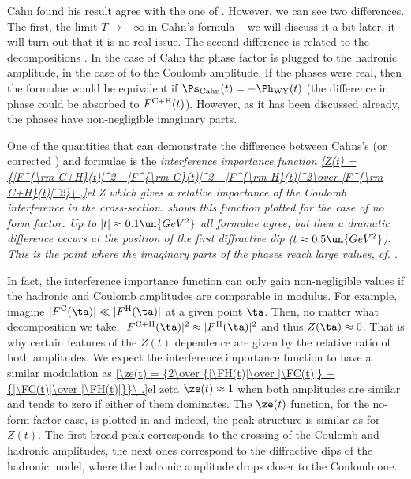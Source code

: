 Cahn found his result  agree with the one of \WY{} . However, we can see two differences. The first, the limit $T\to -\infty$ in Cahn's formula -- we will discuss it a bit later, it will turn out that it is no real issue. The second difference is related to the decompositions . In the case of Cahn the phase factor is plugged to the hadronic amplitude, in the case of \WaY{} to the Coulomb amplitude. If the phases were real, then the formulae would be equivalent if $\Ps_{\rm Cahn}(t) = - \Ph_{\rm WY}(t)$ (the difference in phase could be absorbed to $F^{\rm C+H}(t)$). However, as it has been discussed already, the phases have non-negligible imaginary parts.

One of the quantities that can demonstrate the difference between Cahns's (or corrected \KL) and \WY{} formulae is the \em{interference importance} function
\eqref{Z(t) = {|F^{\rm C+H}(t)|^2 - |F^{\rm C}(t)|^2 - |F^{\rm H}(t)|^2\over |F^{\rm C+H}(t)|^2}\ ,}{el Z}
which gives a relative importance of the Coulomb interference in the cross-section.  shows this function plotted for the case of no form factor. Up to $|t| \approx 0.1\un{GeV^2}$ all formulae agree, but then a dramatic difference occurs at the position of the first diffractive dip ($t\approx 0.5\un{GeV^2}$). This is the point where the imaginary parts of the phases reach large values, cf. .


In fact, the interference importance function can only gain non-negligible values if the hadronic and Coulomb amplitudes are comparable in modulus. For example, imagine $|\FC(\ta)| \ll |\FH(\ta)|$ at a given point $\ta$. Then, no matter what decomposition  we take, $|\FCH(\ta)|^2 \approx |\FH(\ta)|^2$ and thus $Z(\ta) \approx 0$. That is why certain features of the $Z(t)$ dependence are given by the relative ratio of both amplitudes. We expect the interference importance function to have a similar modulation as 
\eqref{\ze(t) = {2\over {|\FH(t)|\over |\FC(t)|} + {|\FC(t)|\over |\FH(t)|}}\ .}{el zeta}
$\ze(t) \approx 1$ when both amplitudes are similar and tends to zero if either of them dominates. The $\ze(t)$ function, for the no-form-factor case, is plotted in  and indeed, the peak structure is similar as for $Z(t)$. The first broad peak corresponds to the crossing of the Coulomb and hadronic amplitudes, the next ones correspond to the diffractive dips of the hadronic model, where the hadronic amplitude drops closer to the Coulomb one.

